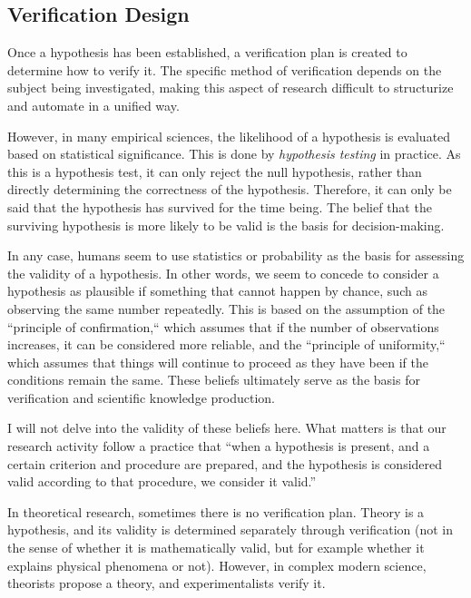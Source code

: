 \documentclass{book}
\begin{document}
\subsection{Verification Design}
Once a hypothesis has been established, a verification plan is created to determine how to verify it. The specific method of verification depends on the subject being investigated, making this aspect of research difficult to structurize and automate in a unified way.

However, in many empirical sciences, the likelihood of a hypothesis is evaluated based on statistical significance. This is done by \textit{hypothesis testing} in practice. As this is a hypothesis test, it can only reject the null hypothesis, rather than directly determining the correctness of the hypothesis. Therefore, it can only be said that the hypothesis has survived for the time being. The belief that the surviving hypothesis is more likely to be valid is the basis for decision-making.

In any case, humans seem to use statistics or probability as the basis for assessing the validity of a hypothesis. In other words, we seem to concede to consider a hypothesis as plausible if something that cannot happen by chance, such as observing the same number repeatedly. This is based on the assumption of the ``principle of confirmation,`` which assumes that if the number of observations increases, it can be considered more reliable, and the ``principle of uniformity,`` which assumes that things will continue to proceed as they have been if the conditions remain the same. These beliefs ultimately serve as the basis for verification and scientific knowledge production. 

I will not delve into the validity of these beliefs here. What matters is that our research activity follow a practice that ``when a hypothesis is present, and a certain criterion and procedure are prepared, and the hypothesis is considered valid according to that procedure, we consider it valid.''

In theoretical research, sometimes there is no verification plan. Theory is a hypothesis, and its validity is determined separately through verification (not in the sense of whether it is mathematically valid, but for example whether it explains physical phenomena or not). However, in complex modern science, theorists propose a theory, and experimentalists verify it.

\end{document}
